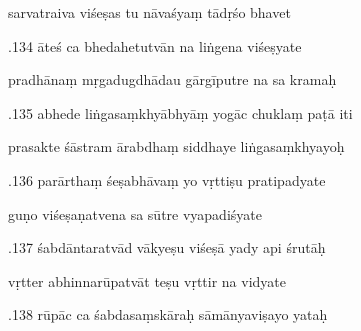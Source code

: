 \documentclass[article,12pt,a4paper]{memoir}%
\newcounter{parCount}
\begin{document}
	  
	  \pstart \leavevmode%
	sarvatraiva viśeṣas tu nāvaśyaṃ tādṛśo bhavet 
	{}
	\pend%
      

	  
	  \pstart {}.134 āteś ca bhedahetutvān na liṅgena viśeṣyate 
	{}
	\pend%
      

	  
	  \pstart \leavevmode%
	pradhānaṃ mṛgadugdhādau gārgīputre na sa kramaḥ 
	{}
	\pend%
      

	  
	  \pstart {}.135 abhede liṅgasaṃkhyābhyāṃ yogāc chuklaṃ paṭā iti 
	{}
	\pend%
      

	  
	  \pstart \leavevmode%
	prasakte śāstram ārabdhaṃ siddhaye liṅgasaṃkhyayoḥ 
	{}
	\pend%
      

	  
	  \pstart {}.136 parārthaṃ śeṣabhāvaṃ yo vṛttiṣu pratipadyate 
	{}
	\pend%
      

	  
	  \pstart \leavevmode%
	guṇo viśeṣaṇatvena sa sūtre vyapadiśyate 
	{}
	\pend%
      

	  
	  \pstart {}.137 śabdāntaratvād vākyeṣu viśeṣā yady api śrutāḥ 
	{}
	\pend%
      

	  
	  \pstart \leavevmode%
	vṛtter abhinnarūpatvāt teṣu vṛttir na vidyate 
	{}
	\pend%
      

	  
	  \pstart {}.138 rūpāc ca śabdasaṃskāraḥ sāmānyaviṣayo yataḥ 
	{}
	\pend%
      
\end{document}

